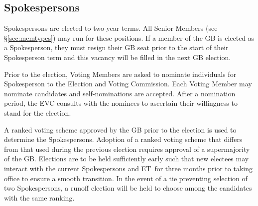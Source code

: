 \documentclass[12pt]{article}
\newcommand{\exec}{{Executive Team}}
\newcommand{\shorte}{{ET}}  %
\begin{document}
\subsection{Spokespersons}

Spokespersons are elected to two-year terms. All Senior Members (see \S\ref{sec:memtypes}) may  run for these positions.  %
If a member of the GB is elected as a Spokesperson, they must resign their GB seat prior to the start of their Spokesperson term and this vacancy will be filled in the next GB election. 

Prior to the election, Voting Members are asked to nominate individuals for Spokesperson to the Election and Voting Commission. Each Voting Member may nominate candidates and self-nominations are accepted. %
After a nomination period, the EVC consults with the nominees to ascertain their willingness to stand for the election.

A ranked voting scheme approved by the GB prior to the election 
is used to determine the Spokespersons.  Adoption of a ranked voting scheme that differs from that used during the previous election requires approval of a supermajority of the GB.  Elections are to be held sufficiently early such that new electees may interact with the current Spokespersons and \shorte\ for three months prior to taking office to ensure a smooth transition. %
In the event of a tie preventing selection of two Spokespersons, a runoff election will be held to choose among the candidates with the same ranking. %

\end{document}

